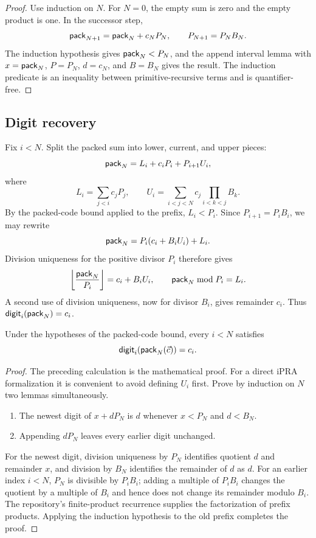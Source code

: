 \begin{proof}
Use induction on \(N\).  For \(N=0\), the empty sum is zero and the empty
product is one.  In the successor step,
\[
 \mathsf{pack}_{N+1}=\mathsf{pack}_N+c_NP_N,
 \qquad P_{N+1}=P_NB_N.
\]
The induction hypothesis gives \(\mathsf{pack}_N<P_N\), and the append interval lemma
with \(x=\mathsf{pack}_N\), \(P=P_N\), \(d=c_N\), and \(B=B_N\) gives the result.  The
induction predicate is an inequality between primitive-recursive terms and is
quantifier-free.
\end{proof}

\subsection{Digit recovery}

Fix \(i<N\).  Split the packed sum into lower, current, and upper pieces:
\[
  \mathsf{pack}_N=L_i+c_iP_i+P_{i+1}U_i,
\]
where
\[
  L_i=\sum_{j<i}c_jP_j,
  \qquad
  U_i=\sum_{i<j<N}c_j\prod_{i<k<j}B_k.
\]
By the packed-code bound applied to the prefix, \(L_i<P_i\).  Since
\(P_{i+1}=P_iB_i\), we may rewrite
\[
 \mathsf{pack}_N=P_i(c_i+B_iU_i)+L_i.
\]
Division uniqueness for the positive divisor \(P_i\) therefore gives
\[
  \left\lfloor\frac{\mathsf{pack}_N}{P_i}\right\rfloor=c_i+B_iU_i,
  \qquad
  \mathsf{pack}_N\bmod P_i=L_i.
\]
A second use of division uniqueness, now for divisor \(B_i\), gives remainder
\(c_i\).  Thus \(\mathsf{digit}_i(\mathsf{pack}_N)=c_i\).

\begin{theorem}
Under the hypotheses of the packed-code bound, every \(i<N\) satisfies
\[
  \mathsf{digit}_i(\mathsf{pack}_N(\vec c))=c_i.
\]
\end{theorem}

\begin{proof}
The preceding calculation is the mathematical proof.  For a direct iPRA
formalization it is convenient to avoid defining \(U_i\) first.  Prove by
induction on \(N\) two lemmas simultaneously.

\begin{enumerate}
\item The newest digit of \(x+dP_N\) is \(d\) whenever \(x<P_N\) and
\(d<B_N\).
\item Appending \(dP_N\) leaves every earlier digit unchanged.
\end{enumerate}

For the newest digit, division uniqueness by \(P_N\) identifies quotient
\(d\) and remainder \(x\), and division by \(B_N\) identifies the remainder of
\(d\) as \(d\).  For an earlier index \(i<N\), \(P_N\) is divisible by
\(P_iB_i\); adding a multiple of \(P_iB_i\) changes the quotient by a multiple
of \(B_i\) and hence does not change its remainder modulo \(B_i\).  The
repository's finite-product recurrence supplies the factorization of prefix
products.  Applying the induction hypothesis to the old prefix completes the
proof.
\end{proof}

